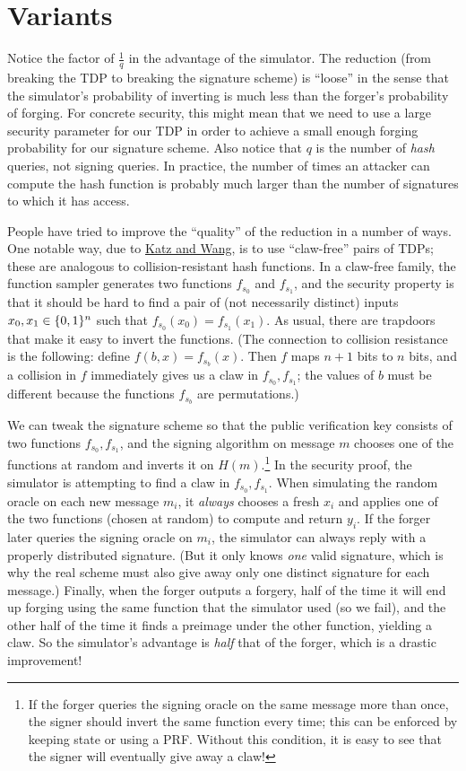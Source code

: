 \documentclass[11pt]{article}
\begin{document}
\section{Variants}
\label{sec:variants}

Notice the factor of $\frac{1}{q}$ in the advantage of the simulator.
The reduction (from breaking the TDP to breaking the signature scheme)
is ``loose'' in the sense that the simulator's probability of
inverting is much less than the forger's probability of forging.  For
concrete security, this might mean that we need to use a large
security parameter for our TDP in order to achieve a small enough
forging probability for our signature scheme.  Also notice that $q$ is
the number of \emph{hash} queries, not signing queries.  In practice,
the number of times an attacker can compute the hash function is
probably much larger than the number of signatures to which it has
access.

People have tried to improve the ``quality'' of the reduction in a
number of ways.  One notable way, due to
\href{http://www.cs.umd.edu/~jkatz/papers/CCCS03_sigs.pdf}{Katz and
  Wang}, is to use ``claw-free'' pairs of TDPs; these are analogous to
collision-resistant hash functions.  In a claw-free family, the
function sampler generates two functions $f_{s_{0}}$ and $f_{s_{1}}$,
and the security property is that it should be hard to find a pair of
(not necessarily distinct) inputs $x_{0}, x_{1} \in \{0,1\}^{n}$ such
that $f_{s_{0}}(x_{0}) = f_{s_{1}}(x_{1})$.  As usual, there are
trapdoors that make it easy to invert the functions.  (The connection
to collision resistance is the following: define $f(b,x) =
f_{s_{b}}(x)$.  Then $f$ maps $n+1$ bits to $n$ bits, and a collision
in $f$ immediately gives us a claw in $f_{s_{0}}, f_{s_{1}}$; the
values of $b$ must be different because the functions $f_{s_{b}}$ are
permutations.)

We can tweak the signature scheme so that the public verification key
consists of two functions $f_{s_{0}}, f_{s_{1}}$, and the signing
algorithm on message $m$ chooses one of the functions at random and
inverts it on $H(m)$.\footnote{If the forger queries the signing
  oracle on the same message more than once, the signer should invert
  the same function every time; this can be enforced by keeping state
  or using a PRF.  Without this condition, it is easy to see that the
  signer will eventually give away a claw!}  In the security proof,
the simulator is attempting to find a claw in $f_{s_{0}}, f_{s_{1}}$.
When simulating the random oracle on each new message $m_{i}$, it
\emph{always} chooses a fresh $x_{i}$ and applies one of the two
functions (chosen at random) to compute and return $y_{i}$.  If the
forger later queries the signing oracle on $m_{i}$, the simulator can
always reply with a properly distributed signature.  (But it only
knows \emph{one} valid signature, which is why the real scheme must
also give away only one distinct signature for each message.)
Finally, when the forger outputs a forgery, half of the time it will
end up forging using the same function that the simulator used (so we
fail), and the other half of the time it finds a preimage under the
other function, yielding a claw.  So the simulator's advantage is
\emph{half} that of the forger, which is a drastic improvement!
\end{document}
